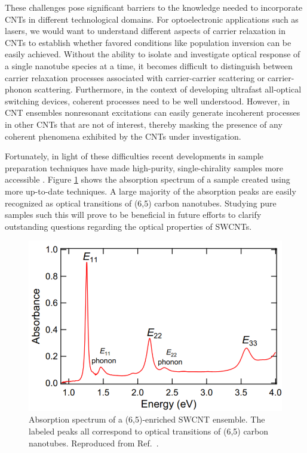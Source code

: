 These challenges pose significant barriers to the knowledge needed to incorporate CNTs in different technological domains. For optoelectronic applications such as lasers, we would want to understand different aspects of carrier relaxation in CNTs to establish whether favored conditions like population inversion can be easily achieved. Without the ability to isolate and investigate optical response of a single nanotube species at a time, it becomes difficult to distinguish between carrier relaxation processes associated with carrier-carrier scattering or carrier-phonon scattering. Furthermore, in the context of developing ultrafast all-optical switching devices, coherent processes need to be well understood. However, in CNT ensembles nonresonant excitations can easily generate incoherent processes in other CNTs that are not of interest, thereby masking the presence of any coherent phenomena exhibited by the CNTs under investigation.

Fortunately, in light of these difficulties recent developments in sample preparation techniques have made high-purity, single-chirality samples more accessible \cite{liu2011large, ichinose2017extraction}. Figure \ref{fig:abs_fumiya} shows the absorption spectrum of a sample created using more up-to-date techniques. A large majority of the absorption peaks are easily recognized as optical transitions of (6,5) carbon nanotubes. Studying pure samples such this will prove to be beneficial in future efforts to clarify outstanding questions regarding the optical properties of SWCNTs. 

\begin{figure}
	\centering
	\includegraphics[scale=0.6]{images/chapter_intro/abs_fumiya}
	\caption{Absorption spectrum of a (6,5)-enriched SWCNT ensemble. The labeled peaks all correspond to optical transitions of (6,5) carbon nanotubes. Reproduced from Ref.\ \cite{katsutani2019direct}.}
	\label{fig:abs_fumiya}
\end{figure}

